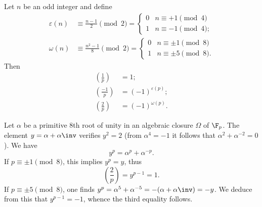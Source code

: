 \documentclass [preview, border = 20pt] {standalone}
\begin{document}
\pagecolor{black}
\color{white}
Let $n$ be an odd integer and define
\begin{align*}
\varepsilon(n) &\equiv \frac{n-1} 2 \pmod 2 = \begin{cases}
0& n\equiv +1\pmod 4\\
1&n\equiv -1 \pmod 4;
\end{cases}\\
\omega(n) &\equiv \frac{n^2-1} 8 \pmod 2 = \begin{cases}
0& n\equiv \pm 1\pmod 8\\
1&n\equiv \pm 5 \pmod 8.
\end{cases}
\end{align*}
Then
\begin{align*}
\left( \frac 1 p \right) &= 1;\\
\left( \frac{-1} p \right) &= (-1)^{\varepsilon(p)};\\
\left(\frac 2 p\right) &= (-1)^{\omega(p)}.
\end{align*}

Let $\alpha$ be a primitive $8$th root of unity in an algebraic closure $\Omega$ of $\F_p$. The element $y = \alpha + \alpha\inv$ verifies $y^2 =2$ (from $\alpha^4=-1$ it follows that $\alpha^2 + \alpha^{-2} = 0$). We have
\[
  y^p = \alpha^p + \alpha^{-p}.
\]
If $p\equiv \pm 1\pmod 8$, this implies $y^p=y$, thus
\[
  \left(\frac 2 p\right) = y^{p-1}=1.
\]
If $p\equiv \pm 5\pmod 8$, one finds $y^p = \alpha^5 +\alpha^{-5} = -(\alpha+\alpha\inv) = -y$. We deduce from this that $y^{p-1}=-1$, whence the third equality follows.
\end{document}
